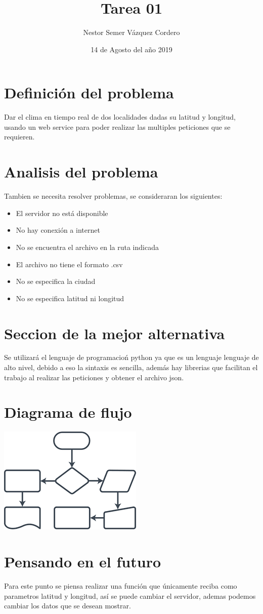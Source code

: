 \documentclass{article}
\title{Tarea 01}
\author{Nestor Semer V\'azquez Cordero}
\date{14 de Agosto del a\~no 2019}
\begin{document}

\maketitle

\section{Definici\'on del problema}

Dar el clima en tiempo real de dos localidades dadas su latitud y longitud, 
usando un web service para poder realizar las multiples peticiones que se requieren.

\section{Analisis del problema}

Tambien se necesita resolver problemas, se consideraran
los siguientes:
\begin{itemize}
 \item El servidor no est\'a disponible
 \item No hay conexi\'on a internet
 \item No se encuentra el archivo en la ruta indicada
 \item El archivo no tiene el formato .csv
 \item No se especifica la ciudad
 \item No se especifica latitud ni longitud
 \end{itemize}

\section{Seccion de la mejor alternativa}

Se utilizar\'a el lenguaje de programacio\'n python ya que es un lenguaje 
lenguaje de alto nivel, 
debido a eso la sintaxis es sencilla, adem\'as  hay librerias que facilitan
 el trabajo al realizar las peticiones y obtener el archivo json.

\section{Diagrama de flujo }
\includegraphics{diagrama}
\section{Pensando en el futuro}

Para este punto se piensa realizar una funci\'on que \'unicamente
reciba como parametros latitud y longitud, as\'i se puede cambiar el servidor, ademas podemos
cambiar los datos que se desean mostrar.
\end{document}
